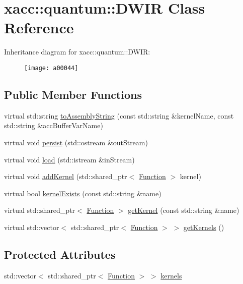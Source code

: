 \hypertarget{a00044}{}\section{xacc\+:\+:quantum\+:\+:D\+W\+IR Class Reference}
\label{a00044}
Inheritance diagram for xacc\+:\+:quantum\+:\+:D\+W\+IR\+:\begin{figure}[H]
\begin{center}
\leavevmode
\texttt{[image: a00044]}
\end{center}
\end{figure}
\subsection*{Public Member Functions}
\begin{DoxyCompactItemize}
\item 
virtual std\+::string \hyperlink{a00044_a880cb60197577ea31115331e3a030e3e}{to\+Assembly\+String} (const std\+::string \&kernel\+Name, const std\+::string \&acc\+Buffer\+Var\+Name)
\item 
virtual void \hyperlink{a00044_abcbfd0a4cf697843391c65cbd9a82080}{persist} (std\+::ostream \&out\+Stream)
\item 
virtual void \hyperlink{a00044_a8b388d719d565bb902c979807d3d0d47}{load} (std\+::istream \&in\+Stream)
\item 
virtual void \hyperlink{a00044_af1bef18e1e9568d1313b03149aab8c1b}{add\+Kernel} (std\+::shared\+\_\+ptr$<$ \hyperlink{a00059}{Function} $>$ kernel)
\item 
virtual bool \hyperlink{a00044_ab5e8861d3bc0845bb015af6208f5f396}{kernel\+Exists} (const std\+::string \&name)
\item 
virtual std\+::shared\+\_\+ptr$<$ \hyperlink{a00059}{Function} $>$ \hyperlink{a00044_a38d8bdd24250749bc38ad31f8512fcfc}{get\+Kernel} (const std\+::string \&name)
\item 
virtual std\+::vector$<$ std\+::shared\+\_\+ptr$<$ \hyperlink{a00059}{Function} $>$ $>$ \hyperlink{a00044_a66e22c5dc95ec46045476864012ad08f}{get\+Kernels} ()
\end{DoxyCompactItemize}
\subsection*{Protected Attributes}
\begin{DoxyCompactItemize}
\item 
std\+::vector$<$ std\+::shared\+\_\+ptr$<$ \hyperlink{a00059}{Function} $>$ $>$ \hyperlink{a00044_abcb04ec3a152c3f22e5a757a9aecabf2}{kernels}
\end{DoxyCompactItemize}



